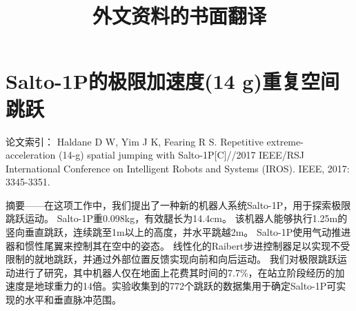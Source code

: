 
\begin{translation}
\label{cha:translation}

\title{外文资料的书面翻译}

\section{Salto-1P的极限加速度(14 g)重复空间跳跃}
论文索引：
Haldane D W, Yim J K, Fearing R S. Repetitive extreme-acceleration (14-g) spatial jumping with Salto-1P[C]//2017 IEEE/RSJ International Conference on Intelligent Robots and Systems (IROS). IEEE, 2017: 3345-3351.

{\kaishu 摘要——}在这项工作中，我们提出了一种新的机器人系统Salto-1P，用于探索极限跳跃运动。 Salto-1P重0.098kg，有效腿长为14.4cm。 该机器人能够执行1.25m的竖向垂直跳跃，连续跳至1m以上的高度，并水平跳越2m。 Salto-1P使用气动推进器和惯性尾翼来控制其在空中的姿态。 线性化的Raibert步进控制器足以实现不受限制的就地跳跃，并通过外部位置反馈实现向前和向后运动。 我们对极限跳跃运动进行了研究，其中机器人仅在地面上花费其时间的7.7\%，在站立阶段经历的加速度是地球重力的14倍。实验收集到的772个跳跃的数据集用于确定Salto-1P可实现的水平和垂直脉冲范围。

\end{translation}
